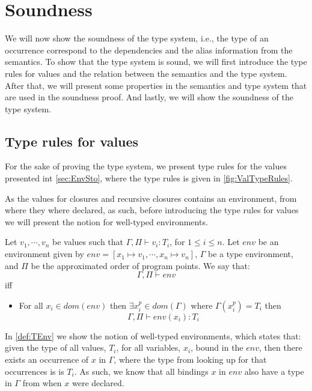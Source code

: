 \documentclass[acmsmall,sigplan]{acmart}
\begin{document}
\section{Soundness}\label{sec:Soundness}

We will now show the soundness of the type system, i.e., the type of
an occurrence correspond to the dependencies and the alias information
from the semantics. 
To show that the type system is sound, we will first introduce the
type rules for values and the relation between the semantics and the
type system. 
After that, we will present some properties in the semantics and type system that are used in the soundness proof.
And lastly, we will show the soundness of the type system. 

\subsection{Type rules for values}
For the sake of proving the type system, we present type rules for the values presented int \cref{sec:EnvSto}, where the type rules is given in \cref{fig:ValTypeRules}.

As the values for closures and recursive closures contains an environment, from where they where declared, as such, before introducing the type rules for values we will present the notion for well-typed environments.

\begin{definition}\label{def:TEnv}
	Let $v_1,\cdots,v_n$ be values such that $\Gamma,\Pi\vdash v_i:T_i$, for $1\leq i\leq n$.
	Let $env$ be an environment given by $env=[x_1\mapsto v_1,\cdots,x_n\mapsto v_n]$, $\Gamma$ be a type environment, and $\Pi$ be the approximated order of program points.
	We say that:
	$$\Gamma,\Pi\vdash env$$
	iff 
	\begin{itemize}
		\item For all $x_i\in dom(env)$ then $\exists x_i^p\in dom(\Gamma)$ where $\Gamma(x_i^p)=T_i$ then 
			$$\Gamma,\Pi\vdash env(x_i):T_i$$
	\end{itemize}
\end{definition}

In \cref{def:TEnv} we show the notion of well-typed environments, which states that: given the type of all values, $T_i$, for all variables, $x_i$, bound in the $env$, 
then there exists an occurrence of $x$ in $\Gamma$, where the type from looking up for that occurrences is is $T_i$.
As such, we know that all bindings $x$ in $env$ also have a type in $\Gamma$ from when $x$ were declared.
\end{document}
